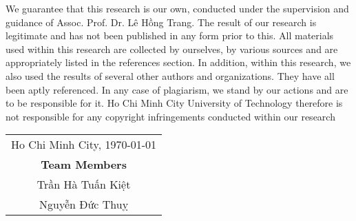 
\begin{declaration}

    We guarantee that this research is our own, conducted under the supervision
    and guidance of Assoc. Prof. Dr. Lê Hồng Trang. The result of our research
    is legitimate and has not been published in any form prior to this. All
    materials used within this research are collected by ourselves, by various
    sources and are appropriately listed in the references section. In addition,
    within this research, we also used the results of several other authors and
    organizations. They have all been aptly referenced. In any case of
    plagiarism, we stand by our actions and are to be responsible for it. Ho Chi
    Minh City University of Technology therefore is not responsible for any
    copyright infringements conducted within our research

    \begin{flushright}

        \begin{tabular}{@{}c@{}} Ho Chi Minh City, \today \\
            \textbf{Team Members}    \\
            Trần Hà Tuấn Kiệt        \\
            Nguyễn Đức Thuỵ
        \end{tabular}

    \end{flushright}
\end{declaration}

\newpage


